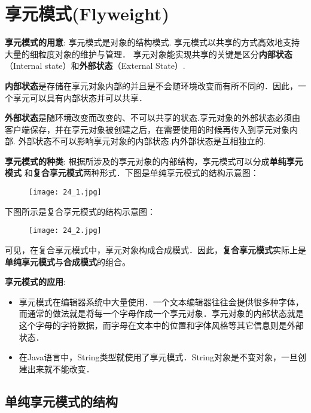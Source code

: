 \documentclass[../main.tex]{subfiles}
\begin{document}
\section{享元模式(Flyweight)}
\textbf{享元模式的用意}:
享元模式是对象的结构模式. 享元模式以共享的方式高效地支持大量的细粒度对象的维护与管理．
享元对象能实现共享的关键是区分\textbf{内部状态}（Internal  state）和\textbf{外部状态}（External State）.

\textbf{内部状态}是存储在享元对象内部的并且是不会随环境改变而有所不同的．因此，一个享元可以具有内部状态并可以共享．

\textbf{外部状态}是随环境改变而改变的、不可以共享的状态.享元对象的外部状态必须由客户端保存，并在享元对象被创建之后，在需要使用的时候再传入到享元对象内部.
外部状态不可以影响享元对象的内部状态.内外部状态是互相独立的.

\textbf{享元模式的种类}:
根据所涉及的享元对象的内部结构，享元模式可以分成\textbf{单纯享元模式}
和\textbf{复合享元模式}两种形式．下图是单纯享元模式的结构示意图：
%
\begin{figure}[H]
  \texttt{[image: 24\_1.jpg]}
\end{figure}
%
下图所示是复合享元模式的结构示意图：
%
\begin{figure}[H]
  \texttt{[image: 24\_2.jpg]}
\end{figure}
%
可见，在复合享元模式中，享元对象构成合成模式．因此，\textbf{复合享元模式}实际上是\textbf{单纯享元模式}与\textbf{合成模式}的组合。

\textbf{享元模式的应用}:
\begin{itemize}
  \item 享元模式在编辑器系统中大量使用．一个文本编辑器往往会提供很多种字体，而通常的做法就是将每一个字母作成一个享元对象．享元对象的内部状态就是这个字母的字符数据，而字母在文本中的位置和字体风格等其它信息则是外部状态．
  \item 在Java语言中，String类型就使用了享元模式．String对象是不变对象，一旦创建出来就不能改变．
\end{itemize}
%
\subsection{单纯享元模式的结构}
\end{document}
